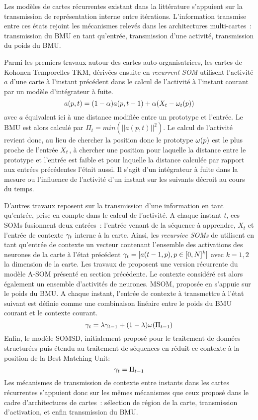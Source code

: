 \documentclass[../main]{subfiles}
\begin{document}
{Les modèles de cartes récurrentes existant dans la littérature s'appuient sur la transmission de représentation interne entre itérations. 
L'information transmise entre ces états rejoint les mécanismes relevés dans les architectures multi-cartes~: transmission du BMU en tant qu'entrée, transmission d'une activité, transmission du poids du BMU.

Parmi les premiers travaux autour des cartes auto-organisatrices, les cartes de Kohonen Temporelles TKM, dérivées ensuite en \emph{recurrent SOM} \cite{varsta_temporal_2001} utilisent l'activité $a$ d'une carte à l'instant précédent dans le calcul de l'activité à l'instant courant par un modèle d'intégrateur à fuite.
$$a(p,t) = (1-\alpha)a(p,t-1) + \alpha(X_t - \omega_t(p)) $$
avec $a$ équivalent ici à une distance modifiée entre un prototype et l'entrée.
Le BMU est alors calculé par $\Pi_t = min(|| a(p,t) || ^2)$.
Le calcul de l'activité revient donc, au lieu de chercher la position donc le prototype $\omega(p)$ est le plus proche de l'entrée $X_t$, à chercher une position pour laquelle la distance entre le prototype et l'entrée est faible et pour laquelle la distance calculée par rapport aux entrées précédentes l'était aussi. Il s'agit d'un intégrateur à fuite dans la mesure ou l'influence de l'activité d'un instant sur les suivants décroit au cours du temps.

D'autres travaux reposent sur la transmission d'une information en tant qu'entrée, prise en compte dans le calcul de l'activité.
A chaque instant $t$, ces SOMs fusionnent deux entrées~: l'entrée venant de la séquence à apprendre, $X_t$ et l'entrée de contexte $\gamma_t$ interne à la carte.
Ainsi, les \emph{recursive SOMs} de \cite{Voegtlin2002RecursiveSM} utilisent en tant qu'entrée de contexte un vecteur contenant l'ensemble des activations des neurones de la carte à l'état précédent $\gamma_t = [a(t-1,p), p \in [0,N]^k]$ avec $k = 1, 2$ la dimension de la carte.
Les travaux de \cite{Buonamente2013SimulatingAW} proposent une version récurrente du modèle A-SOM présenté en section précédente. 
Le contexte considéré est alors également un ensemble d'activités de neurones. 
MSOM, proposée en \cite{Strickert2005MergeSF} s'appuie sur le poids du BMU. 
A chaque instant, l'entrée de contexte à transmettre à l'état suivant est définie comme une combinaison linéaire entre le poids du BMU courant et le contexte courant.
$$\gamma_t = \lambda \gamma_{t-1} + (1-\lambda)\omega(\Pi_{t-1}) $$
Enfin, le modèle SOMSD, initialement proposé pour le traitement de données structurées \cite{hagenbuchner_self-organizing_2003} puis étendu au traitement de séquences en \cite{hammer_recursive_2004,hammer_self-organizing_2005} réduit ce contexte à la position de la Best Matching Unit:
$$ \gamma_{t} = \Pi_{t-1}$$
Les mécanismes de transmission de contexte entre instants dans les cartes récurrentes s'appuient donc sur les mêmes mécanismes que ceux proposé dans le cadre d'architectures de cartes~: sélection de région de la carte, transmission d'activation, et enfin transmission du BMU.

}
\end{document}
